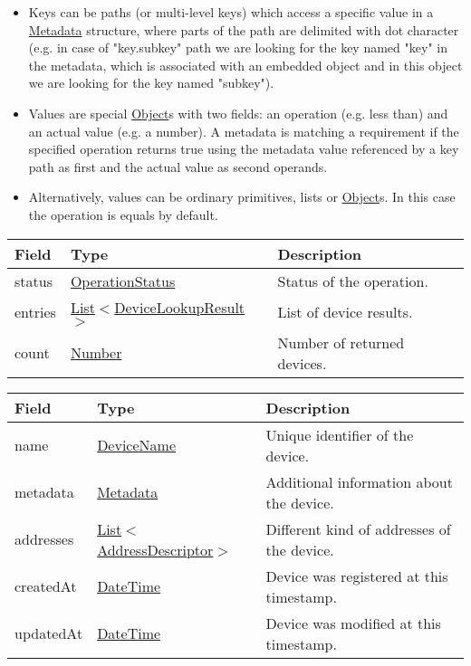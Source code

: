 \documentclass[a4paper]{arrowhead}
\newcommand{\pref}[1]{{\textcolor{ArrowheadGrey}{\hyperref[sec:model:primitives:#1]{#1}}}}
\begin{document}
\begin{itemize}
    \item Keys can be paths (or multi-level keys) which access a specific value in a \hyperref[sec:model:Metadata]{Metadata} structure, where parts of the path are delimited with dot character (e.g. in case of "key.subkey" path we are looking for the key named "key" in the metadata, which is associated with an embedded object and in this object we are looking for the key named "subkey").
    \item Values are special \pref{Object}s with two fields: an operation (e.g. less than) and an actual value (e.g. a number). A metadata is matching a requirement if the specified operation returns true using the metadata value referenced by a key path as first and the actual value as second operands. 
    \item Alternatively, values can be ordinary primitives, lists or \pref{Object}s. In this case the operation is equals by default.
\end{itemize}


\begin{table}[ht!]
\begin{tabularx}{\textwidth}{| p{3cm} | p{6cm} | X |} \hline
\rowcolor{gray!33} Field & Type      & Description \\ \hline
status & \pref{OperationStatus} & Status of the operation. \\ \hline
entries & \pref{List}$<$\hyperref[sec:model:DeviceLookupResult]{DeviceLookupResult}$>$     & List of device results. \\ \hline
count & \pref{Number} & Number of returned devices. \\ \hline
\end{tabularx}
\end{table}

 
\begin{table}[ht!]
\begin{tabularx}{\textwidth}{| p{4.25cm} | p{4cm} | X |} \hline
\rowcolor{gray!33} Field & Type      & Description \\ \hline
name & \pref{DeviceName} & Unique identifier of the device. \\ \hline
metadata & \hyperref[sec:model:Metadata]{Metadata} & Additional information about the device. \\ \hline
addresses &  \pref{List}$<$\hyperref[sec:model:AddressDescriptor]{AddressDescriptor}$>$ & Different kind of addresses of the device.  \\ \hline
createdAt & \pref{DateTime} & Device was registered at this timestamp. \\ \hline
updatedAt & \pref{DateTime} & Device was modified at this timestamp. \\ \hline
\end{tabularx}
\end{table}
\end{document}
